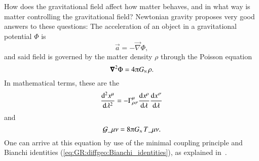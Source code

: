 










How does the gravitational field affect how matter behaves, and in what way is matter controlling the gravitational field? Newtonian gravity proposes very good answers to these questions: The acceleration of an object in a gravitational potential $\Phi$ is
\begin{equation}
    \vec{a} = -\vec{\nabla} \Phi,
\end{equation}
and said field is governed by the matter density $\rho$ through the Poisson equation
\begin{equation}
    \vec{\nabla}^2\Phi =  4 \ppi G\nped{N} \,\rho.
\end{equation}
 In mathematical terms, these are the 
\begin{equation}
    \dv[2]{x\^\mu}{\lambda} = - \Gamma\indices*{^\mu_{\rho\sigma}} \dv{x\^\rho}{\lambda} \dv{x\^\sigma}{\lambda}
\end{equation}
and 
\begin{equation}\label{eq:GR:einstein:Einstein_eq_G}
    \mathcal{G}\_{\mu\nu} = 8 \ppi G\nped{N} \, T\_{\mu\nu}.
\end{equation}
One can arrive at this equation by use of the minimal coupling principle and Bianchi identities (\cref{eq:GR:diffgeo:Bianchi_identities}), as explained in~\citet[Ch.~4]{carrollSpacetimeGeometryIntroduction2019}. %
